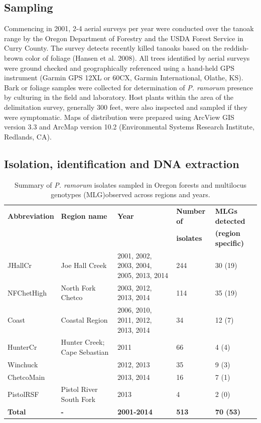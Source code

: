 \documentclass[double,12pt]{beavtex}
\begin{document}
  \newpage
  
  \subsection{Sampling}\label{sampling}
  
  Commencing in 2001, 2-4 aerial surveys per year were conducted over the
  tanoak range by the Oregon Department of Forestry and the USDA Forest
  Service in Curry County. The survey detects recently killed tanoaks
  based on the reddish-brown color of foliage (Hansen et al. 2008). All
  trees identified by aerial surveys were ground checked and
  geographically referenced using a hand-held GPS instrument (Garmin GPS
  12XL or 60CX, Garmin International, Olathe, KS). Bark or foliage samples
  were collected for determination of \emph{P. ramorum} presence by
  culturing in the field and laboratory. Host plants within the area of
  the delimitation survey, generally 300 feet, were also inspected and
  sampled if they were symptomatic. Maps of distribution were prepared
  using ArcView GIS version 3.3 and ArcMap version 10.2 (Environmental
  Systems Research Institute, Redlands, CA).
  
  \subsection{Isolation, identification and DNA
  extraction}\label{isolation-identification-and-dna-extraction}
  
  \begin{table}
  \begin{tabular}{@{}lllll@{}}
  \toprule
  \textbf{Abbreviation} & \textbf{Region name} & \textbf{Year} &
  \textbf{Number of} & \textbf{MLGs detected}\tabularnewline
   & & & \textbf{isolates} & \textbf{(region specific)}\tabularnewline
  \midrule
  JHallCr & Joe Hall Creek & 2001, 2002, 2003, 2004, 2005, 2013, 2014 &
  244 & 30 (19)\tabularnewline
  NFChetHigh & North Fork Chetco & 2003, 2012, 2013, 2014 & 114 & 35
  (19)\tabularnewline
  Coast & Coastal Region & 2006, 2010, 2011, 2012, 2013, 2014 & 34 & 12
  (7)\tabularnewline
  HunterCr & Hunter Creek; Cape Sebastian & 2011 & 66 & 4
  (4)\tabularnewline
  Winchuck & & 2012, 2013 & 35 & 9 (3)\tabularnewline
  ChetcoMain & & 2013, 2014 & 16 & 7 (1)\tabularnewline
  PistolRSF & Pistol River South Fork & 2013 & 4 & 2 (0)\tabularnewline
  \textbf{Total} & \textbf{-} & \textbf{2001-2014} & \textbf{513} &
  \textbf{70 (53)}\tabularnewline
  \bottomrule
  \end{tabular}
  \caption{Summary of \emph{P. ramorum} isolates sampled in Oregon forests and multilocus genotypes (MLG)observed across regions and years.
  }
  \label{tab:ramorum1}
  \end{table}
  
\end{document}
